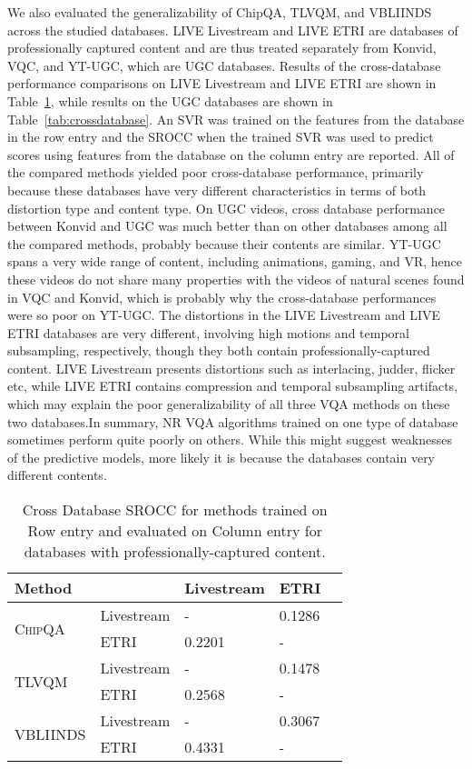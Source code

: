 \documentclass[journal]{IEEEtran}
\begin{document}
We also evaluated the generalizability of ChipQA, TLVQM, and VBLIINDS across the studied databases. LIVE Livestream and LIVE ETRI are databases of professionally captured content and are thus treated separately from Konvid, VQC, and YT-UGC, which are UGC databases. Results of the cross-database performance comparisons on LIVE Livestream and LIVE ETRI are shown in Table~\ref{tab:crossdatabase_pro}, while results on the UGC databases are shown in  Table~\ref{tab:crossdatabase}. An SVR was trained on the features from the database in the row entry and the SROCC when the trained SVR was used to predict scores using features from the database on the column entry are reported. All of the compared methods yielded poor cross-database performance, primarily because these databases have very different characteristics in terms of both distortion type and content type. On UGC videos, cross database performance between Konvid and UGC was much better than on other databases among all the compared methods, probably because their contents are similar. YT-UGC spans a very wide range of content, including animations, gaming, and VR, hence these videos do not share many properties with the videos of natural scenes found in VQC and Konvid, which is probably why the cross-database performances were so poor on YT-UGC.  The distortions in the LIVE Livestream and LIVE ETRI databases are very different, involving high motions and temporal subsampling, respectively, though they both contain professionally-captured content. LIVE Livestream presents distortions such as interlacing, judder, flicker etc, while LIVE ETRI contains compression and temporal subsampling artifacts, which may explain the poor generalizability of all three VQA methods on these two databases.{In summary, NR VQA algorithms trained on one type of database sometimes perform quite poorly on others. While this might suggest weaknesses of the predictive models, more likely it is because the databases contain very different contents.}


\begin{table}
\caption{ Cross Database SROCC for methods trained on Row entry and evaluated on Column entry for databases with professionally-captured content.} 
\begin{center} 
\begin{tabular}{|l|l|l|l|l|}
\hline
 Method & & Livestream & ETRI \\
\hline
\multirow{2}{*}{\textsc{ChipQA}}  & Livestream &  - & 0.1286 \\
& ETRI & 0.2201 & -  \\
\hline
\multirow{2}{*}{\textsc{TLVQM}}  & Livestream &  - & 0.1478 \\
& ETRI & 0.2568 & - \\
\hline
\multirow{2}{*}{\textsc{VBLIINDS}}  & Livestream &  - &  0.3067 \\
& ETRI & 0.4331 & - \\
\hline
\end{tabular}
\label{tab:crossdatabase_pro}
\end{center}
\vspace{-5mm}
\end{table}
\end{document}

